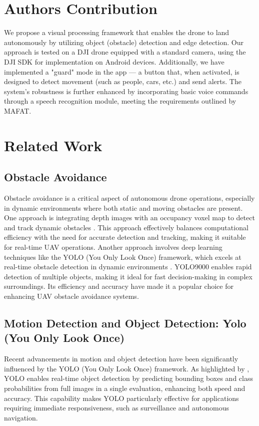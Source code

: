 \documentclass[unnumsec,webpdf,modern,large]{mam-authoring-template}%
\begin{document}
\section{Authors Contribution}\label{sec2}
We propose a visual processing framework that enables the drone to land autonomously by utilizing object (obstacle) detection and edge detection. Our approach is tested on a DJI drone equipped with a standard camera, using the DJI SDK for implementation on Android devices. Additionally, we have implemented a "guard" mode in the app — a button that, when activated, is designed to detect movement (such as people, cars, etc.) and send alerts. The system's robustness is further enhanced by incorporating basic voice commands through a speech recognition module, meeting the requirements outlined by MAFAT.

\section{Related Work}\label{sec3}
\subsection{Obstacle Avoidance}
Obstacle avoidance is a critical aspect of autonomous drone operations, especially in dynamic environments where both static and moving obstacles are present. One approach is integrating depth images with an occupancy voxel map to detect and track dynamic obstacles \cite{xu2023real}.
This approach effectively balances computational efficiency with the need for accurate detection and tracking, making it suitable for real-time UAV operations. Another approach involves deep learning techniques like the YOLO (You Only Look Once) framework, which excels at real-time obstacle detection in dynamic environments \cite{redmon2017yolo9000}. YOLO9000 enables rapid detection of multiple objects, making it ideal for fast decision-making in complex surroundings. Its efficiency and accuracy have made it a popular choice for enhancing UAV obstacle avoidance systems.

\subsection{Motion Detection and Object Detection: Yolo (You Only Look Once)}
Recent advancements in motion and object detection have been significantly influenced by the YOLO (You Only Look Once) framework. As highlighted by \cite{dahirou2021motion}, YOLO enables real-time object detection by predicting bounding boxes and class probabilities from full images in a single evaluation, enhancing both speed and accuracy. This capability makes YOLO particularly effective for applications requiring immediate responsiveness, such as surveillance and autonomous navigation.
\end{document}
